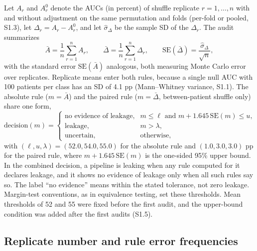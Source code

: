 \documentclass[final,1p,times]{elsarticle}
\begin{document}
Let $A_r$ and $A_r^{0}$ denote the AUCs (in percent) of shuffle replicate $r=1,\dots,n$ with and without adjustment on the same permutation and folds (per-fold or pooled, S1.3), let $\Delta_r=A_r-A_r^{0}$, and let $\hat{\sigma}_{\Delta}$ be the sample SD of the $\Delta_r$. The audit summarizes
\begin{equation}\label{eq:bocor}
\bar{A}=\frac{1}{n}\sum_{r=1}^{n}A_r,\qquad
\bar{\Delta}=\frac{1}{n}\sum_{r=1}^{n}\Delta_r,\qquad
\mathrm{SE}(\bar{\Delta})=\frac{\hat{\sigma}_{\Delta}}{\sqrt{n}},
\end{equation}
with the standard error $\mathrm{SE}(\bar{A})$ analogous, both measuring Monte Carlo error over replicates. Replicate means enter both rules, because a single null AUC with 100 patients per class has an SD of 4.1 pp (Mann--Whitney variance, S1.1). The absolute rule ($m=\bar{A}$) and the paired rule ($m=\bar{\Delta}$, between-patient shuffle only) share one form,
\begin{equation}\label{eq:aturan}
\text{decision}(m)=
\begin{cases}
\text{no evidence of leakage}, & m\leq\ell \text{ and } m+1.645\,\mathrm{SE}(m)\leq u,\\
\text{leakage}, & m>\lambda,\\
\text{uncertain}, & \text{otherwise},
\end{cases}
\end{equation}
with $(\ell,u,\lambda)=(52.0,54.0,55.0)$ for the absolute rule and $(1.0,3.0,3.0)$ pp for the paired rule, where $m+1.645\,\mathrm{SE}(m)$ is the one-sided 95\% upper bound. In the combined decision, a pipeline is leaking when any rule computed for it declares leakage, and it shows no evidence of leakage only when all such rules say so. The label ``no evidence'' means within the stated tolerance, not zero leakage. Margin-test conventions, as in equivalence testing, set these thresholds. Mean thresholds of 52 and 55 were fixed before the first audit, and the upper-bound condition was added after the first audits (S1.5).

\subsection{Replicate number and rule error frequencies}\label{sec:metode_n}
\end{document}

